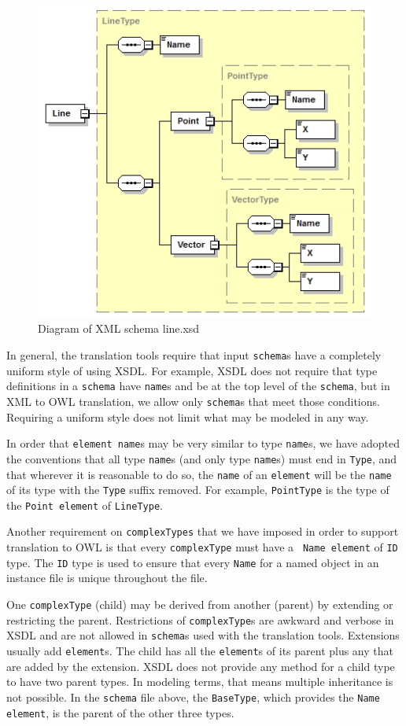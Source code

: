 \documentclass[preprint,12pt]{elsarticle}
\begin{document}
\begin{figure}
	\centering
	\includegraphics [width=0.8 \textwidth]{lineDiagram.jpg}
	\caption{Diagram of XML schema line.xsd }
	\label{lineDiagram}
\end{figure}

In general, the translation tools require that input {\tt schema}s have a
completely uniform style of using XSDL. For example, XSDL does not require
that type definitions in a {\tt schema} have {\tt name}s and be at the top
level of the {\tt schema}, but in XML to OWL translation, we allow only
{\tt schema}s that meet those conditions. Requiring a uniform style does
not limit what may be modeled in any way.

In order that {\tt element name}s may be very similar to type {\tt name}s,
we have adopted the conventions that all type {\tt name}s (and only type
{\tt name}s) must end in {\tt Type}, and that wherever it is reasonable to
do so, the {\tt name} of an {\tt element} will be the {\tt name} of its
type with the {\tt Type} suffix removed. For example, {\tt PointType} is the
type of the {\tt Point element} of {\tt LineType}.

Another requirement on {\tt complexTypes} that we have imposed in order to
support translation to OWL is that every {\tt complexType} must have a {\tt
  Name element} of {\tt ID} type. The {\tt ID} type is used to ensure that
every {\tt Name} for a named object in an instance file is unique
throughout the file.

One {\tt complexType} (child) may be derived from another (parent) by
extending or restricting the parent. Restrictions of {\tt complexType}s are
awkward and verbose in XSDL and are not allowed in {\tt schema}s used with
the translation tools. Extensions usually add {\tt element}s. The child has
all the {\tt element}s of its parent plus any that are added by the
extension. XSDL does not provide any method for a child type to have two
parent types. In modeling terms, that means multiple inheritance is not
possible. In the {\tt schema} file above, the {\tt BaseType}, which
provides the {\tt Name element}, is the parent of the other three types.
\end{document}
